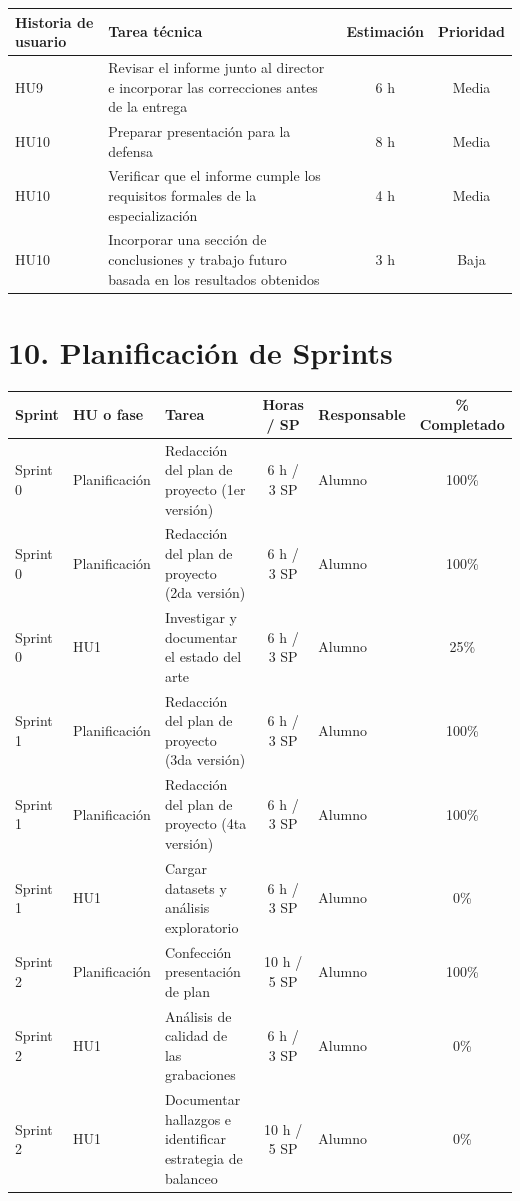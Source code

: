 \documentclass[
11pt, %
]{charter}
\begin{document}
\begin{table}[htpb]
\begin{tabularx}{\linewidth}{@{}|X|X|c|c|@{}}
\hline
\rowcolor[HTML]{C0C0C0}
Historia de usuario & Tarea técnica & Estimación & Prioridad \\ \hline
HU9 & Revisar el informe junto al director e incorporar las correcciones antes de la entrega & 6 h & Media \\ \hline
HU10 & Preparar presentación para la defensa & 8 h & Media \\ \hline
HU10 & Verificar que el informe cumple los requisitos formales de la especialización & 4 h & Media \\ \hline
HU10 & Incorporar una sección de conclusiones y trabajo futuro basada en los resultados obtenidos & 3 h & Baja \\ \hline
\end{tabularx}
\end{table}

\section{10. Planificación de Sprints}

\begin{table}[H]
\centering
\begin{tabularx}{\linewidth}{@{}|l|l|X|c|l|c|@{}}
\hline
\rowcolor[HTML]{C0C0C0}
Sprint & HU o fase & Tarea & Horas / SP & Responsable & \% Completado \\ \hline
Sprint 0 & Planificación & Redacción del plan de proyecto (1er versión) & 6 h / 3 SP & Alumno & 100\% \\ \hline
Sprint 0 & Planificación & Redacción del plan de proyecto (2da versión) & 6 h / 3 SP & Alumno & 100\% \\ \hline
Sprint 0 & HU1 & Investigar y documentar el estado del arte & 6 h / 3 SP & Alumno & 25\% \\ \hline
Sprint 1 & Planificación & Redacción del plan de proyecto (3da versión) & 6 h / 3 SP & Alumno & 100\% \\ \hline
Sprint 1 & Planificación & Redacción del plan de proyecto (4ta versión) & 6 h / 3 SP & Alumno & 100\% \\ \hline
Sprint 1 & HU1 & Cargar datasets y análisis exploratorio & 6 h / 3 SP & Alumno & 0\% \\ \hline
Sprint 2 & Planificación & Confección presentación de plan & 10 h / 5 SP & Alumno & 100\% \\ \hline
Sprint 2 & HU1 & Análisis de calidad de las grabaciones & 6 h / 3 SP & Alumno & 0\% \\ \hline
Sprint 2 & HU1 & Documentar hallazgos e identificar estrategia de balanceo & 10 h / 5 SP & Alumno & 0\% \\ \hline
\end{tabularx}
\end{table}
\end{document}
